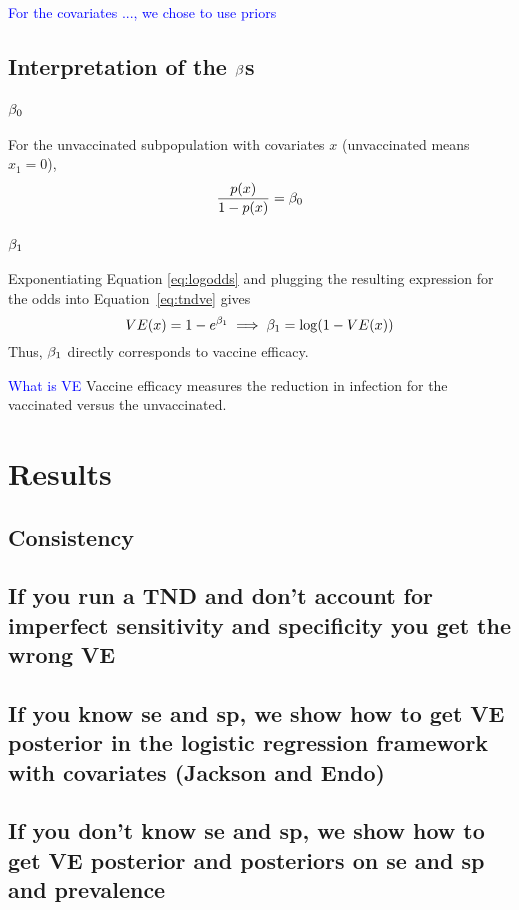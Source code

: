 \documentclass[11pt,notitlepage,twoside]{article}
\newcommand{\ej}[1]{\textcolor{blue}{#1}}
\begin{document}
\ej{For the covariates ..., we chose to use priors}

\subsection{Interpretation of the $\beta$s}
\subsubsection{$\beta_0$}
For the unvaccinated subpopulation with covariates $x$ (unvaccinated means $x_1=0$), 
\begin{equation}
\frac{p(x)}{1-p(x)} = \beta_0
\end{equation}
\subsubsection{$\beta_1$}
Exponentiating Equation \ref{eq:logodds} and plugging the resulting expression for the odds into Equation~\ref{eq:tndve} gives
\begin{equation}
  VE(x) = 1 - e^{\beta_1} \implies \beta_1 = \log(1-VE(x))
\end{equation}
Thus, $\beta_1$ directly corresponds to vaccine efficacy.

\ej{What is VE}
Vaccine efficacy measures the reduction in infection for the vaccinated versus the unvaccinated. 

\section{Results}
\subsection{Consistency}

\subsection{If you run a TND and don't account for imperfect sensitivity and specificity you get the wrong VE}

\subsection{If you know se and sp, we show how to get VE posterior in the logistic regression framework with covariates (Jackson and Endo)}

\subsection{If you don’t know se and sp, we show how to get VE posterior and posteriors on se and sp and prevalence}
\end{document}
